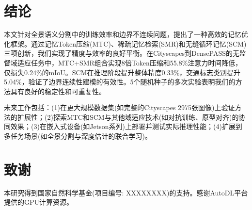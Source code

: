 \section{结论}

本文针对全景语义分割中的训练效率和边界不连续问题，提出了一种高效的记忆优化框架。通过记忆Token压缩(MTC)、稀疏记忆检索(SMR)和无缝循环记忆(SCM)三项创新，我们实现了精度与效率的良好平衡。在Cityscapes到DensePASS的无监督域适应任务中，MTC+SMR组合实现8倍Token压缩和55.8\%注意力时间降低，仅损失0.24\%的mIoU。SCM在推理阶段提升整体精度0.33\%，交通标志类别提升5.04\%，验证了边界连续性建模的有效性。5个随机种子的多次实验表明我们的方法具有良好的稳定性和可重复性。

未来工作包括：(1)在更大规模数据集(如完整的Cityscapes 2975张图像)上验证方法的扩展性；(2)探索MTC和SCM与其他域适应技术(如对抗训练、原型对齐)的协同效果；(3)在嵌入式设备(如Jetson系列)上部署并测试实际推理性能；(4)扩展到多任务场景(如全景分割与深度估计的联合学习)。

\section*{致谢}

本研究得到国家自然科学基金(项目编号: XXXXXXXX)的支持。感谢AutoDL平台提供的GPU计算资源。
